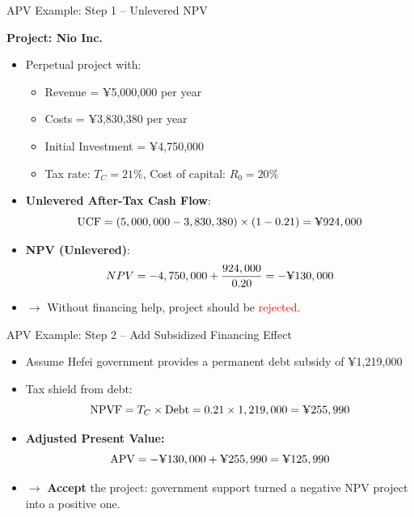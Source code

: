 \begin{frame}{APV Example: Step 1 – Unlevered NPV}
	
	\textbf{Project: Nio Inc.}
	
	\begin{itemize}
		\item Perpetual project with:
		\begin{itemize}
			\item Revenue = ¥5,000,000 per year
			\item Costs = ¥3,830,380 per year
			\item Initial Investment = ¥4,750,000
			\item Tax rate: \( T_C = 21\% \), Cost of capital: \( R_0 = 20\% \)
		\end{itemize}
		
		\item \textbf{Unlevered After-Tax Cash Flow}:
		\[
		\text{UCF} = (5,000,000 - 3,830,380) \times (1 - 0.21) = \text{\textyen}924,000
		\]
		
		\item \textbf{NPV (Unlevered)}:
		\[
		NPV = -4,750,000 + \frac{924,000}{0.20} = -\text{\textyen}130,000
		\]
		
		\item $\rightarrow$ Without financing help, project should be \textcolor{red}{rejected}.
	\end{itemize}
	
\end{frame}
\begin{frame}{APV Example: Step 2 – Add Subsidized Financing Effect}
	
	\begin{itemize}
		\item Assume Hefei government provides a permanent debt subsidy of ¥1,219,000
		\item Tax shield from debt:
		\[
		\text{NPVF} = T_C \times \text{Debt} = 0.21 \times 1,219,000 = \text{\textyen}255,990
		\]
		
		\item \textbf{Adjusted Present Value:}
		\[
		\text{APV} = -\text{\textyen}130,000 + \text{\textyen}255,990 = \text{\textyen}125,990
		\]
		
		\item $\rightarrow$ \textbf{Accept} the project: government support turned a negative NPV project into a positive one.
	\end{itemize}
	
\end{frame}

